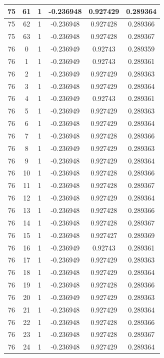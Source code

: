 \documentclass[12pt,a4paper]{article}
\numberwithin{equation}{section}
\numberwithin{figure}{section}
\numberwithin{table}{section}
\begin{document}
\begin{longtable}{|c|c|c|c|c|c|}
75 & 61 & 1 & -0.236948 & 0.927429 & 0.289364 \\ \hline
75 & 62 & 1 & -0.236948 & 0.927428 & 0.289366 \\ \hline
75 & 63 & 1 & -0.236948 & 0.927428 & 0.289367 \\ \hline
76 & 0 & 1 & -0.236949 & 0.92743 & 0.289359 \\ \hline
76 & 1 & 1 & -0.236949 & 0.92743 & 0.289361 \\ \hline
76 & 2 & 1 & -0.236949 & 0.927429 & 0.289363 \\ \hline
76 & 3 & 1 & -0.236948 & 0.927429 & 0.289364 \\ \hline
76 & 4 & 1 & -0.236949 & 0.92743 & 0.289361 \\ \hline
76 & 5 & 1 & -0.236949 & 0.927429 & 0.289363 \\ \hline
76 & 6 & 1 & -0.236948 & 0.927429 & 0.289364 \\ \hline
76 & 7 & 1 & -0.236948 & 0.927428 & 0.289366 \\ \hline
76 & 8 & 1 & -0.236949 & 0.927429 & 0.289363 \\ \hline
76 & 9 & 1 & -0.236948 & 0.927429 & 0.289364 \\ \hline
76 & 10 & 1 & -0.236948 & 0.927428 & 0.289366 \\ \hline
76 & 11 & 1 & -0.236948 & 0.927428 & 0.289367 \\ \hline
76 & 12 & 1 & -0.236948 & 0.927429 & 0.289364 \\ \hline
76 & 13 & 1 & -0.236948 & 0.927428 & 0.289366 \\ \hline
76 & 14 & 1 & -0.236948 & 0.927428 & 0.289367 \\ \hline
76 & 15 & 1 & -0.236948 & 0.927427 & 0.289369 \\ \hline
76 & 16 & 1 & -0.236949 & 0.92743 & 0.289361 \\ \hline
76 & 17 & 1 & -0.236949 & 0.927429 & 0.289363 \\ \hline
76 & 18 & 1 & -0.236948 & 0.927429 & 0.289364 \\ \hline
76 & 19 & 1 & -0.236948 & 0.927428 & 0.289366 \\ \hline
76 & 20 & 1 & -0.236949 & 0.927429 & 0.289363 \\ \hline
76 & 21 & 1 & -0.236948 & 0.927429 & 0.289364 \\ \hline
76 & 22 & 1 & -0.236948 & 0.927428 & 0.289366 \\ \hline
76 & 23 & 1 & -0.236948 & 0.927428 & 0.289367 \\ \hline
76 & 24 & 1 & -0.236948 & 0.927429 & 0.289364 \\ \hline

\end{longtable}
\end{document}
